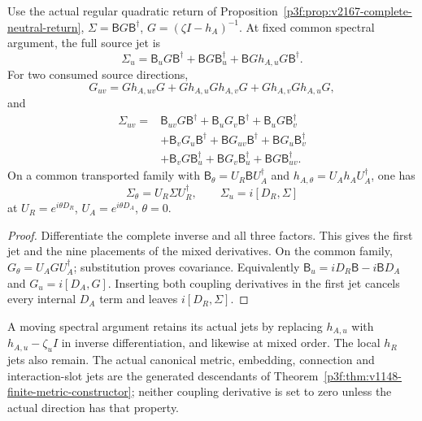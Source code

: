 \documentclass[12pt,a4paper]{article}
\begin{document}
\begin{theorem}
\label{p5c:thm:next187-complete-coupling-covariance}
Use the actual regular quadratic return of
Proposition~\ref{p3f:prop:v2167-complete-neutral-return},
$\Sigma=\mathsf B G\mathsf B^\dagger$, $G=(\zeta I-h_A)^{-1}$.
At fixed common spectral argument, the full source jet is
\begin{equation}
 \boxed{\Sigma_u=\mathsf B_uG\mathsf B^\dagger+
 \mathsf BG\mathsf B_u^\dagger+
 \mathsf BGh_{A,u}G\mathsf B^\dagger.}
 \label{p5c:eq:next187-complete-coupling-jet}
\end{equation}
For two consumed source directions,
\[
 G_{uv}=Gh_{A,uv}G+Gh_{A,u}Gh_{A,v}G+Gh_{A,v}Gh_{A,u}G,
\]
and
\begin{equation}
\begin{aligned}
 \Sigma_{uv}={}&\mathsf B_{uv}G\mathsf B^\dagger+
 \mathsf B_uG_v\mathsf B^\dagger+\mathsf B_uG\mathsf B_v^\dagger\\
 &+\mathsf B_vG_u\mathsf B^\dagger+\mathsf BG_{uv}\mathsf B^\dagger+
 \mathsf BG_u\mathsf B_v^\dagger\\
 &+\mathsf B_vG\mathsf B_u^\dagger+\mathsf BG_v\mathsf B_u^\dagger+
 \mathsf BG\mathsf B_{uv}^\dagger.
\end{aligned}
\label{p5c:eq:next187-complete-mixed-coupling-jet}
\end{equation}
On a common transported family with
$\mathsf B_\theta=U_R\mathsf BU_A^\dagger$ and
$h_{A,\theta}=U_Ah_AU_A^\dagger$, one has
\begin{equation}
 \boxed{\Sigma_\theta=U_R\Sigma U_R^\dagger,
 \qquad \Sigma_u=i[D_R,\Sigma]}
 \label{p5c:eq:next187-return-covariance}
\end{equation}
at $U_R=e^{i\theta D_R}$, $U_A=e^{i\theta D_A}$, $\theta=0$.
\end{theorem}
\begin{proof}
Differentiate the complete inverse and all three factors. This gives the
first jet and the nine placements of the mixed derivatives. On the common
family, $G_\theta=U_AGU_A^\dagger$; substitution proves covariance.
Equivalently $\mathsf B_u=iD_R\mathsf B-i\mathsf BD_A$ and
$G_u=i[D_A,G]$. Inserting both coupling derivatives in the first jet
cancels every internal $D_A$ term and leaves $i[D_R,\Sigma]$.
\end{proof}
A moving spectral argument retains its actual jets by replacing
$h_{A,u}$ with $h_{A,u}-\zeta_uI$ in inverse differentiation, and
likewise at mixed order. The local $h_R$ jets also remain. The actual
canonical metric, embedding, connection and interaction-slot jets are the
generated descendants of
Theorem~\ref{p3f:thm:v1148-finite-metric-constructor}; neither coupling
derivative is set to zero unless the actual direction has that property.
\end{document}
